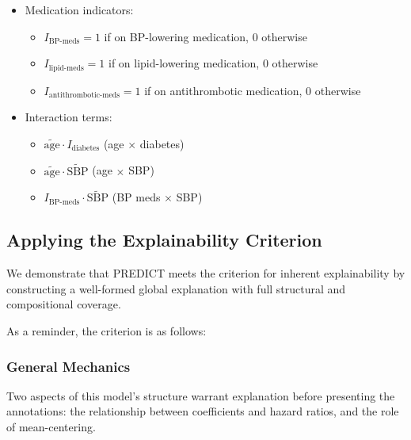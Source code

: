 \documentclass{article}
\begin{document}
\begin{itemize}
\begin{itemize}
    \end{itemize}
  \item Medication indicators:
    \begin{itemize}
      \item \(I_{\text{BP-meds}} = 1\) if on BP-lowering medication, 0 otherwise
      \item \(I_{\text{lipid-meds}} = 1\) if on lipid-lowering medication, 0 otherwise
      \item \(I_{\text{antithrombotic-meds}} = 1\) if on antithrombotic medication, 0 otherwise
    \end{itemize}
  \item Interaction terms:
    \begin{itemize}
      \item \(\tilde{\text{age}} \cdot I_{\text{diabetes}}\) (age \(\times\) diabetes)
      \item \(\tilde{\text{age}} \cdot \widetilde{\text{SBP}}\) (age \(\times\) SBP)
      \item \(I_{\text{BP-meds}} \cdot \widetilde{\text{SBP}}\) (BP meds \(\times\) SBP)
    \end{itemize}
\end{itemize}

\subsection{Applying the Explainability Criterion}

We demonstrate that PREDICT meets the criterion for inherent explainability by constructing a well-formed global explanation with full structural and compositional coverage.

As a reminder, the criterion is as follows:

\explainability*
\subsubsection{General Mechanics}

Two aspects of this model's structure warrant explanation before presenting the annotations: the relationship between coefficients and hazard ratios, and the role of mean-centering.
\end{document}
